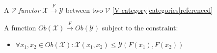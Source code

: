 
A $\mathcal{V}$ \emph{functor} $\mathcal{X}\xrightarrow{F}\mathcal{Y}$ between two $\mathcal{V}$ \ref{V-category|categories|referenced}

A function $Ob(\mathcal{X})\xrightarrow{F}Ob(\mathcal{Y})$ subject to the constraint:
\begin{itemize}
  \item $\forall x_1,x_2 \in Ob(\mathcal{X}): \mathcal{X}(x_1,x_2) \leq \mathcal{Y}(F(x_1),F(x_2))$
\end{itemize}
